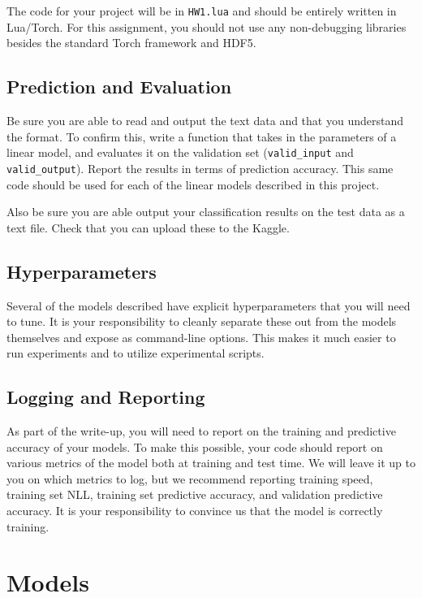 \documentclass[11pt]{article}
\begin{document}
The code for your project will be in \texttt{HW1.lua} and should be
entirely written in Lua/Torch. For this assignment, you should not use
any non-debugging libraries besides the standard Torch framework and
HDF5.

\subsection{Prediction and Evaluation}

Be sure you are able to read and output the text data 
and that you understand the format. To confirm this, write a function 
that takes in the parameters of a linear model, and evaluates it on 
the validation set (\texttt{valid\_input} and \texttt{valid\_output}).
Report the results in terms of prediction accuracy. This same code should 
be used for each of the linear models described in this project. 

Also be sure you are able output your classification results on the test data as 
a text file. Check that you can upload these to the Kaggle.

\subsection{Hyperparameters}

Several of the models described have explicit hyperparameters that you will 
need to tune. It is your responsibility to cleanly separate these out from 
the models themselves and expose as command-line options. This makes it much 
easier to run experiments and to utilize experimental scripts. 

\subsection{Logging and Reporting}

As part of the write-up, you will need to report on the training and
predictive accuracy of your models. To make this possible, your code
should report on various metrics of the model both at training and
test time. We will leave it up to you on which metrics to log, but we
recommend reporting training speed, training set NLL, training set
predictive accuracy, and validation predictive accuracy. It is your
responsibility to convince us that the model is correctly training.

\section{Models}
\end{document}
